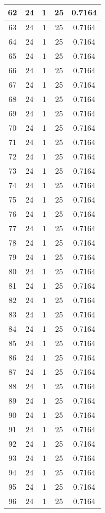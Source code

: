 \documentclass[letterpaper, 12pt]{article}
\begin{document}
\begin{longtable}{|c|c|c|c|c|}
\hline
62 & 24 & 1 & 25 & 0.7164 \\
\hline
63 & 24 & 1 & 25 & 0.7164 \\
\hline
64 & 24 & 1 & 25 & 0.7164 \\
\hline
65 & 24 & 1 & 25 & 0.7164 \\
\hline
66 & 24 & 1 & 25 & 0.7164 \\
\hline
67 & 24 & 1 & 25 & 0.7164 \\
\hline
68 & 24 & 1 & 25 & 0.7164 \\
\hline
69 & 24 & 1 & 25 & 0.7164 \\
\hline
70 & 24 & 1 & 25 & 0.7164 \\
\hline
71 & 24 & 1 & 25 & 0.7164 \\
\hline
72 & 24 & 1 & 25 & 0.7164 \\
\hline
73 & 24 & 1 & 25 & 0.7164 \\
\hline
74 & 24 & 1 & 25 & 0.7164 \\
\hline
75 & 24 & 1 & 25 & 0.7164 \\
\hline
76 & 24 & 1 & 25 & 0.7164 \\
\hline
77 & 24 & 1 & 25 & 0.7164 \\
\hline
78 & 24 & 1 & 25 & 0.7164 \\
\hline
79 & 24 & 1 & 25 & 0.7164 \\
\hline
80 & 24 & 1 & 25 & 0.7164 \\
\hline
81 & 24 & 1 & 25 & 0.7164 \\
\hline
82 & 24 & 1 & 25 & 0.7164 \\
\hline
83 & 24 & 1 & 25 & 0.7164 \\
\hline
84 & 24 & 1 & 25 & 0.7164 \\
\hline
85 & 24 & 1 & 25 & 0.7164 \\
\hline
86 & 24 & 1 & 25 & 0.7164 \\
\hline
87 & 24 & 1 & 25 & 0.7164 \\
\hline
88 & 24 & 1 & 25 & 0.7164 \\
\hline
89 & 24 & 1 & 25 & 0.7164 \\
\hline
90 & 24 & 1 & 25 & 0.7164 \\
\hline
91 & 24 & 1 & 25 & 0.7164 \\
\hline
92 & 24 & 1 & 25 & 0.7164 \\
\hline
93 & 24 & 1 & 25 & 0.7164 \\
\hline
94 & 24 & 1 & 25 & 0.7164 \\
\hline
95 & 24 & 1 & 25 & 0.7164 \\
\hline
96 & 24 & 1 & 25 & 0.7164 \\

\end{longtable}
\end{document}
